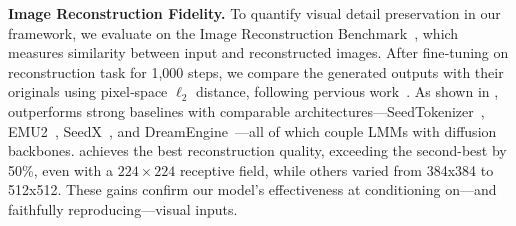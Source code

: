 \textbf{Image Reconstruction Fidelity.}
To quantify visual detail preservation in our framework, we evaluate \model on the Image Reconstruction Benchmark~\citep{dreamengine}, which measures similarity between input and reconstructed images. After fine‑tuning on reconstruction task for 1{,}000 steps, we compare the generated outputs with their originals using pixel‑space $\ell_2$ distance, following pervious work~\citep{dreamengine}. As shown in , \model outperforms strong baselines with comparable architectures—SeedTokenizer~\citep{seed-tokenizer}, EMU2~\citep{emu2}, SeedX~\citep{2024SeedX}, and DreamEngine~\citep{dreamengine}—all of which couple LMMs with diffusion backbones.
\model achieves the best reconstruction quality, exceeding the second-best by 50\%, even with a $224{\times}224$ receptive field, while others varied from 384x384 to 512x512.
These gains confirm our model’s effectiveness at conditioning on—and faithfully reproducing—visual inputs.






